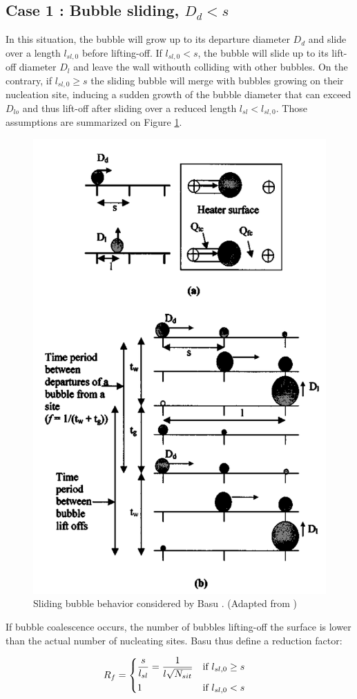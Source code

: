 \subsection{Case 1 : Bubble sliding, $D_{d}<s$}

In this situation, the bubble will grow up to its departure diameter $D_{d}$ and slide over a length $l_{sl,0}$ before lifting-off. If $l_{sl,0}<s$, the bubble will slide up to its lift-off diameter $D_{l}$ and leave the wall withouth colliding with other bubbles. On the contrary, if $l_{sl,0}\geq s$ the sliding bubble will merge with bubbles growing on their nucleation site, inducing a sudden growth of the bubble diameter that can exceed $D_{lo}$ and thus lift-off after sliding over a reduced length $l_{sl}<l_{sl,0}$. Those assumptions are summarized on Figure \ref{fig:Basu_sliding}.

\begin{figure}[h]
\centering
\includegraphics[width=0.5\linewidth]{img/HFP/Basu/slide.PNG}
\caption{Sliding bubble behavior considered by Basu \etal. (Adapted from \cite{Basu2005})}
\label{fig:Basu_sliding}
\end{figure}
	

If bubble coalescence occurs, the number of bubbles lifting-off the surface is lower than the actual number of nucleating sites. Basu \etal thus define a reduction factor:

\begin{align}
R_{f}&=
\begin{dcases}
\dfrac{s}{l_{sl}} = \dfrac{1}{l\sqrt{N_{sit}}} & \text{if } l_{sl,0} \geq s \\
1 & \text{if } l_{sl,0}<s
\end{dcases}
\label{eq:HFP_B_Rf}
\end{align}  


